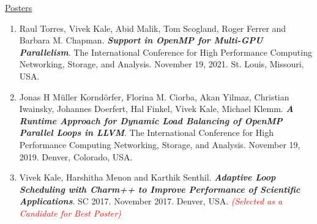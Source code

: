 \underline{Posters}
\vspace*{-0.05in}
\begin{enumerate}
\item Raul Torres, Vivek Kale, Abid Malik, Tom Scogland, Roger Ferrer and Barbara M. Chapman. \textbf{\textit{Support in OpenMP for Multi-GPU Parallelism}}. The International Conference for High Performance Computing Networking, Storage, and Analysis. November 19, 2021. St. Louis, Missouri, USA.

\item Jonas H Müller Korndörfer, Florina M. Ciorba, Akan Yilmaz, Christian Iwainsky, Johannes Doerfert, Hal Finkel, Vivek Kale, Michael Klemm. \textbf{\textit{A Runtime Approach for Dynamic Load Balancing of OpenMP Parallel Loops in LLVM}}. The International Conference for High Performance Computing Networking, Storage, and Analysis. November 19, 2019. Denver, Colorado, USA.
\item Vivek Kale, Harshitha Menon and Karthik Senthil. \textbf{\textit{Adaptive Loop Scheduling with Charm++ to Improve Performance of Scientific Applications}}. SC 2017. November 2017. Denver, USA. \textit{\textcolor{red}{(Selected as a Candidate for Best Poster)}}
\end{enumerate}




